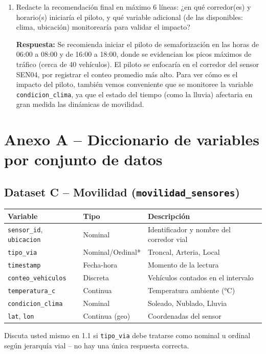 \documentclass[11pt]{article}
\begin{document}
\begin{pregunta}
\begin{enumerate}[label=\alph*)]
  \item Redacte la recomendación final en máximo 6 líneas: ¿en qué corredor(es) y horario(s) iniciaría el piloto, y qué variable adicional (de las disponibles: clima, ubicación) monitorearía para validar el impacto?

  \textbf{Respuesta:} Se recomienda iniciar el piloto de semaforización en las horas de 06:00 a 08:00 y de 16:00 a 18:00, donde se evidencian los picos máximos de tráfico (cerca de 40 vehículos). El piloto se enfocaría en el corredor del sensor SEN04, por registrar el conteo promedio más alto. Para ver cómo es el impacto del piloto, también vemos conveniente que se monitoree la variable \texttt{condicion\_clima}, ya que el estado del tiempo (como la lluvia) afectaria en gran medida las dinámicas de movilidad.

\end{enumerate}
\end{pregunta}

\newpage
\appendix
\section*{Anexo A -- Diccionario de variables por conjunto de datos}

\subsection*{Dataset C -- Movilidad (\texttt{movilidad\_sensores})}
\begin{longtable}{p{3.2cm}p{3cm}p{7cm}}
\toprule
Variable & Tipo & Descripción \\
\midrule
\texttt{sensor\_id}, \texttt{ubicacion} & Nominal & Identificador y nombre del corredor vial \\
\texttt{tipo\_via} & Nominal/Ordinal* & Troncal, Arteria, Local \\
\texttt{timestamp} & Fecha-hora & Momento de la lectura \\
\texttt{conteo\_vehiculos} & Discreta & Vehículos contados en el intervalo \\
\texttt{temperatura\_c} & Continua & Temperatura ambiente (°C) \\
\texttt{condicion\_clima} & Nominal & Soleado, Nublado, Lluvia \\
\texttt{lat}, \texttt{lon} & Continua (geo) & Coordenadas del sensor \\
\bottomrule
\end{longtable}
{\footnotesize *Discuta usted mismo en 1.1 si \texttt{tipo\_via} debe tratarse como nominal u ordinal según jerarquía vial -- no hay una única respuesta correcta.}
\end{document}
